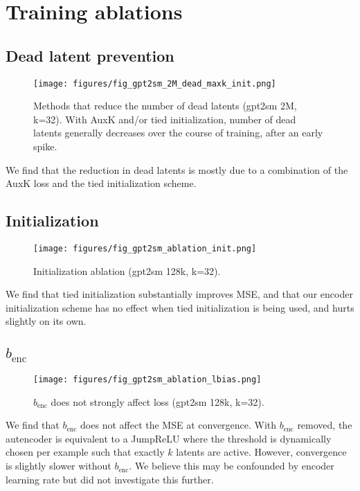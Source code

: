 \section{Training ablations}

\subsection{Dead latent prevention}

\begin{figure}[h]
    \centering
    \texttt{[image: figures/fig\_gpt2sm\_2M\_dead\_maxk\_init.png]}
    \caption{Methods that reduce the number of dead latents (gpt2sm 2M, k=32).  With AuxK and/or tied initialization, number of dead latents generally decreases over the course of training, after an early spike.}
    \label{fig:ablation-dead-latents}
\end{figure}

We find that the reduction in dead latents is mostly due to a combination of the AuxK loss and the tied initialization scheme.


\subsection{Initialization}

\begin{figure}[h]
    \centering
    \texttt{[image: figures/fig\_gpt2sm\_ablation\_init.png]}
    \caption{Initialization ablation (gpt2sm 128k, k=32).}
    \label{fig:init-ablation}
\end{figure}

We find that tied initialization substantially improves MSE, and that our encoder initialization scheme has no effect when tied initialization is being used, and hurts slightly on its own. 

\subsection{$b_{\textrm{enc}}$}

\begin{figure}[h]
    \centering
    \texttt{[image: figures/fig\_gpt2sm\_ablation\_lbias.png]}
    \caption{$b_{\textrm{enc}}$ does not strongly affect loss (gpt2sm 128k, k=32).}
    \label{fig:encoder-bias-ablation}
\end{figure}
We find that $b_{\textrm{enc}}$ does not affect the MSE at convergence. With $b_{\textrm{enc}}$ removed, the autencoder is equivalent to a JumpReLU where the threshold is dynamically chosen per example such that exactly $k$ latents are active. However, convergence is slightly slower without $b_{\textrm{enc}}$. We believe this may be confounded by encoder learning rate but did not investigate this further.  



